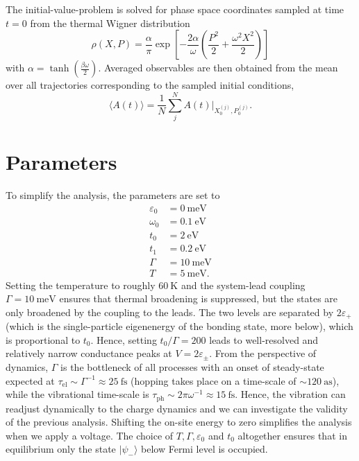 \documentclass{article}
\begin{document}
The initial-value-problem is solved for phase space coordinates sampled at time $t=0$ from the thermal Wigner distribution
\begin{equation}
	\rho(X,P) = \frac{\alpha}{\pi}\exp\left[-\frac{2\alpha}{\omega}\left(\frac{P^2}{2}+\frac{\omega^2X^2}{2}\right)\right]
\end{equation} 
with $\alpha=\tanh\left(\frac{\beta\omega}{2}\right)$. Averaged observables are then obtained from the mean over all trajectories corresponding to the sampled initial conditions, 
\begin{equation}
	\langle A(t)\rangle = \frac{1}{N}\sum_j^N A(t)\big\vert_{X_0^{(j)},P_0^{(j)}}.
\end{equation}
\section{Parameters}\label{sec:SimpleParams}
To simplify the analysis, the parameters are set to
\begin{align*}
	\varepsilon_0 &= \SI{0}{\milli\electronvolt}\\
	\omega_0 &= \SI{0.1}{\electronvolt}\\
	t_0 &= \SI{2}{\electronvolt}\\
	t_1 &= \SI{0.2}{\electronvolt}\\
	\Gamma &= \SI{10}{\milli\electronvolt}\\
	T &= \SI{5}{\milli\electronvolt}.
\end{align*}
Setting the temperature to roughly $\SI{60}{\kelvin}$ and the system-lead coupling $\Gamma=\SI{10}{\milli\electronvolt}$ ensures that thermal broadening is suppressed, but the states are only broadened by the coupling to the leads. 
The two levels are separated by $2\varepsilon_+$ (which is the single-particle eigenenergy of the bonding state, more below), which is proportional to $t_0$. Hence, setting $t_0/\Gamma = 200$ leads to well-resolved and relatively narrow conductance peaks at $V=2\varepsilon_\pm$. From the perspective of dynamics, $\Gamma$ is the bottleneck of all processes with an onset of steady-state expected at $\tau_\mathrm{el}\sim\Gamma^{-1}\approx \SI{25}{\femto\second}$ (hopping takes place on a time-scale of $\sim \SI{120}{\atto\second}$), while the vibrational time-scale is $\tau_\mathrm{ph}\sim 2\pi\omega^{-1} \approx \SI{15}{\femto\second}$. Hence, the vibration can readjust dynamically to the charge dynamics and we can investigate the validity of the previous analysis. 
Shifting the on-site energy to zero simplifies the analysis when we apply a voltage. The choice of $T,\Gamma,\varepsilon_0$ and $t_0$ altogether ensures that in equilibrium only the state $\vert\psi_-\rangle$ below Fermi level is occupied. 
\end{document}
